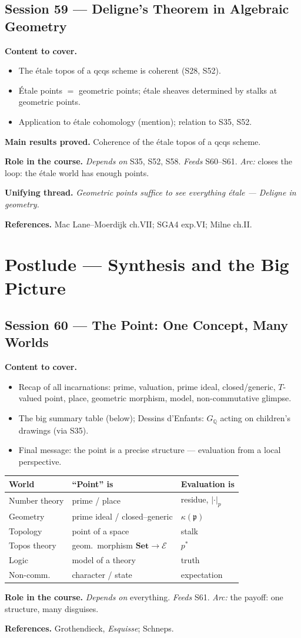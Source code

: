\documentclass[11pt,a4paper]{article}
\newcommand{\sess}[2]{\subsection[#1. #2]{Session #1 --- #2}}
\newcommand{\chead}{\par\smallskip\noindent\textbf{Content to cover.}}
\newcommand{\proved}[1]{\par\smallskip\noindent\textbf{Main results proved.} #1}
\newcommand{\role}[1]{\par\smallskip\noindent\textbf{Role in the course.} #1}
\newcommand{\thread}[1]{\par\smallskip\noindent\textbf{Unifying thread.} \textit{#1}}
\newcommand{\srefs}[1]{\par\smallskip\noindent\textbf{References.} #1}
\newcommand{\Q}{\mathbb{Q}}
\newcommand{\p}{\mathfrak{p}}
\begin{document}
	\sess{59}{Deligne's Theorem in Algebraic Geometry}
	\chead
	\begin{itemize}
		\item The \'etale topos of a qcqs scheme is coherent (S28, S52).
		\item \'Etale points $=$ geometric points; \'etale sheaves determined by stalks at geometric points.
		\item Application to \'etale cohomology (mention); relation to S35, S52.
	\end{itemize}
	\proved{Coherence of the \'etale topos of a qcqs scheme.}
	\role{\emph{Depends on} S35, S52, S58. \emph{Feeds} S60--S61. \emph{Arc:} closes the loop: the \'etale world has enough points.}
	\thread{Geometric points suffice to see everything \'etale --- Deligne in geometry.}
	\srefs{Mac Lane--Moerdijk ch.VII; SGA4 exp.VI; Milne ch.II.}
	
	\section{Postlude --- Synthesis and the Big Picture}
	
	\sess{60}{The Point: One Concept, Many Worlds}
	\chead
	\begin{itemize}
		\item Recap of all incarnations: prime, valuation, prime ideal, closed/generic, $T$-valued point, place, geometric morphism, model, non-commutative glimpse.
		\item The big summary table (below); Dessins d'Enfants: $G_\Q$ acting on children's drawings (via S35).
		\item Final message: the point is a precise structure --- evaluation from a local perspective.
	\end{itemize}
	\begin{center}\small
		\begin{tabular}{|l|l|l|}
			\hline
			\textbf{World} & \textbf{``Point'' is} & \textbf{Evaluation is} \\
			\hline
			Number theory & prime / place & residue, $|\cdot|_p$ \\
			Geometry & prime ideal / closed--generic & $\kappa(\p)$ \\
			Topology & point of a space & stalk \\
			Topos theory & geom.\ morphism $\mathbf{Set}\to\mathcal E$ & $p^*$ \\
			Logic & model of a theory & truth \\
			Non-comm.\ & character / state & expectation \\
			\hline
		\end{tabular}
	\end{center}
	\role{\emph{Depends on} everything. \emph{Feeds} S61. \emph{Arc:} the payoff: one structure, many disguises.}
	\srefs{Grothendieck, \emph{Esquisse}; Schneps.}
	
\end{document}
